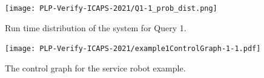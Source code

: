 \documentclass[letterpaper]{article}
\begin{document}

\begin{figure}[htb!]
  \centering
  \texttt{[image: PLP-Verify-ICAPS-2021/Q1-1\_prob\_dist.png]}  
  \vspace{-0.08in}
  \caption{Run time distribution of the system for Query 1.}
  \label{fig:robotic-example-query1}
\end{figure}

\begin{figure}
  \centering
  \texttt{[image: PLP-Verify-ICAPS-2021/example1ControlGraph-1-1.pdf]}  
  \vspace{-0.1in} 
  \caption{The control graph for the service robot example.}
  \label{fig:robotic-example-control-graph}
\end{figure}




\end{document}
